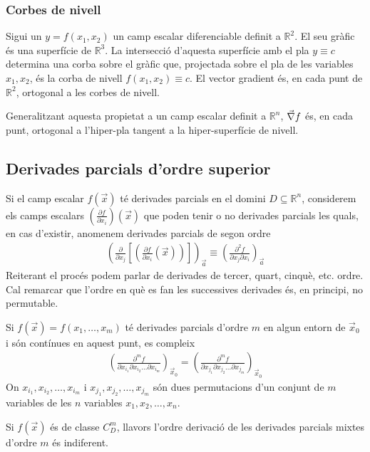 \subsubsection*{Corbes de nivell}
Sigui un $y = f(x_{1},x_{2})$ un camp escalar diferenciable definit a $\mathbb{R}^{2}$. El seu gràfic és una superfície de $\mathbb{R}^{3}$. La intersecció d'aquesta superfície amb el pla $y \equiv c$ determina una corba sobre el gràfic que, projectada sobre el pla de les variables $x_{1}, x_{2}$, és la corba de nivell $f(x_{1}, x_{2}) \equiv c$. El vector gradient és, en cada punt de $\mathbb{R}^{2}$, ortogonal a les corbes de nivell.

Generalitzant aquesta propietat a un camp escalar definit a $\mathbb{R}^{n}$, $\vec{\nabla} f$ és, en cada punt, ortogonal a l'hiper-pla tangent a la hiper-superfície de nivell.
\subsection{Derivades parcials d'ordre superior}
Si el camp escalar $f(\vec{x})$ té derivades parcials en el domini $D \subseteq \mathbb{R}^{n}$, considerem els camps escalars $\displaystyle \left( \frac{\partial f}{\partial x_{i}} \right) (\vec{x})$ que poden tenir o no derivades parcials les quals, en cas d'existir, anomenem derivades parcials de segon ordre
\begin{align}
    \left ( \frac{\partial}{\partial x_{j}} \left[ \left( \frac{\partial f}{\partial x_{i}} (\vec{x}) \right) \right] \right)_{\vec{a}} \equiv \left( \frac{\partial^{2} f}{\partial x_{j} \partial x_{i}} \right)_{\vec{a}}
\end{align}
Reiterant el procés podem parlar de derivades de tercer, quart, cinquè, etc. ordre. Cal remarcar que l'ordre en què es fan les successives derivades és, en principi, no permutable.
\begin{thm}[de Schwarz]
Si $f(\vec{x}) = f(x_{1}, \dots, x_{m})$ té derivades parcials d'ordre $m$ en algun entorn de $\vec{x}_{0}$ i són contínues en aquest punt, es compleix
\begin{align}
    \left( \frac{\partial^{m} f}{\partial x_{i_{1}} \partial x_{i_{2}} \dots \partial x_{i_{m}}} \right)_{\vec{x}_{0}} = \left( \frac{\partial^{m} f}{\partial x_{j_{1}} \partial x_{j_{2}} \dots \partial x_{j_{m}}} \right)_{\vec{x}_{0}}
\end{align}
On $x_{i_{1}}, x_{i_{2}}, \dots, x_{i_{m}}$ i $x_{j_{1}}, x_{j_{2}}, \dots, x_{j_{m}}$ són dues permutacions d'un conjunt de $m$ variables de les $n$ variables $x_{1}, x_{2}, \dots, x_{n}$.
\end{thm}
\begin{cor}
    Si $f(\vec{x})$ és de classe $C_{D}^{m}$, llavors l'ordre derivació de les derivades parcials mixtes d'ordre $m$ és indiferent.
\end{cor}
